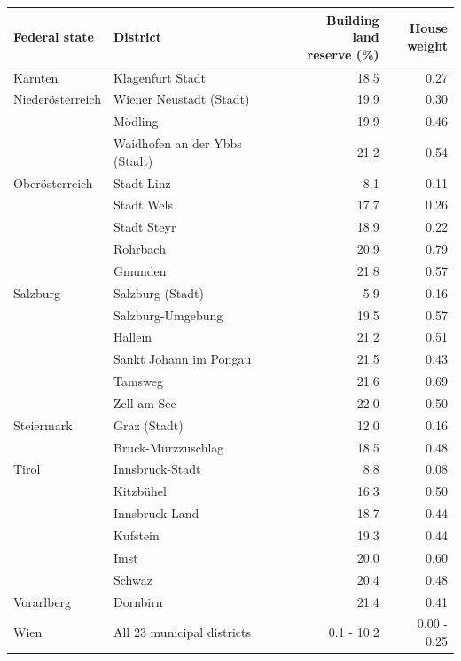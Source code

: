 \begin{tabular}{l l r r}
\toprule
Federal state & District & \makecell{Building land\\reserve (\%)} & \makecell{House\\weight} \\
\midrule
Kärnten & Klagenfurt Stadt & 18.5 & 0.27 \\
Niederösterreich & Wiener Neustadt (Stadt) & 19.9 & 0.30 \\
 & Mödling & 19.9 & 0.46 \\
 & Waidhofen an der Ybbs (Stadt) & 21.2 & 0.54 \\
Oberösterreich & Stadt Linz & 8.1 & 0.11 \\
 & Stadt Wels & 17.7 & 0.26 \\
 & Stadt Steyr & 18.9 & 0.22 \\
 & Rohrbach & 20.9 & 0.79 \\
 & Gmunden & 21.8 & 0.57 \\
Salzburg & Salzburg (Stadt) & 5.9 & 0.16 \\
 & Salzburg-Umgebung & 19.5 & 0.57 \\
 & Hallein & 21.2 & 0.51 \\
 & Sankt Johann im Pongau & 21.5 & 0.43 \\
 & Tamsweg & 21.6 & 0.69 \\
 & Zell am See & 22.0 & 0.50 \\
Steiermark & Graz (Stadt) & 12.0 & 0.16 \\
 & Bruck-Mürzzuschlag & 18.5 & 0.48 \\
Tirol & Innsbruck-Stadt & 8.8 & 0.08 \\
 & Kitzbühel & 16.3 & 0.50 \\
 & Innsbruck-Land & 18.7 & 0.44 \\
 & Kufstein & 19.3 & 0.44 \\
 & Imst & 20.0 & 0.60 \\
 & Schwaz & 20.4 & 0.48 \\
Vorarlberg & Dornbirn & 21.4 & 0.41 \\
\addlinespace
Wien & All 23 municipal districts & 0.1 - 10.2 & 0.00 - 0.25 \\
\bottomrule
\end{tabular}
